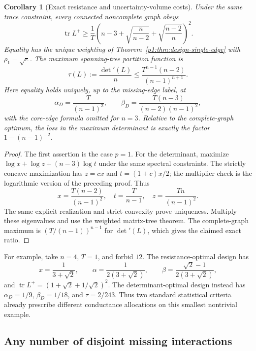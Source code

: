 \documentclass[11pt,a4paper]{article}
\newtheorem{corollary}[theorem]{Corollary}
\theoremstyle{definition}
\theoremstyle{remark}
\numberwithin{equation}{section}
\begin{document}
\begin{corollary}[Exact resistance and uncertainty-volume costs]
\label{p1:cor:design-single-special}
Under the same trace constraint, every connected noncomplete graph obeys
\begin{equation}\label{p1:eq:design-A-bound}
 \operatorname{tr}L^+\ge
 \frac1T\left(n-3+\sqrt{\frac n{n-2}}
                    +\sqrt{\frac{n-2}n}\right)^2.
\end{equation}
Equality has the unique weighting of
Theorem~\ref{p1:thm:design-single-edge} with $\rho_1=\sqrt c$.
The maximum spanning-tree partition function is
\begin{equation}\label{p1:eq:design-tree-bound}
 \tau(L):=\frac{\det'(L)}n
 \le\frac{T^{n-1}(n-2)}{(n-1)^{n+1}}.
\end{equation}
Here equality holds uniquely, up to the missing-edge label, at
\[
 \alpha_D=\frac{T}{(n-1)^2},\qquad
 \beta_D=\frac{T(n-3)}{(n-2)(n-1)^2},
\]
with the core-edge formula omitted for $n=3$.
Relative to the complete-graph optimum, the loss in the maximum
determinant is exactly the factor $1-(n-1)^{-2}$.
\end{corollary}
\begin{proof}
The first assertion is the case $p=1$.  For the determinant, maximize
$\log x+\log z+(n-3)\log t$ under the same spectral constraints.
The strictly concave maximization has $z=cx$ and
$t=(1+c)x/2$; the multiplier check is the logarithmic version of the
preceding proof.  Thus
\[
 x=\frac{T(n-2)}{(n-1)^2},\quad
 t=\frac{T}{n-1},\quad z=\frac{Tn}{(n-1)^2}.
\]
The same explicit realization and strict convexity prove uniqueness.
Multiply these eigenvalues and use the weighted matrix-tree theorem.
The complete-graph maximum is $(T/(n-1))^{n-1}$ for $\det'(L)$,
which gives the claimed exact ratio.
\end{proof}

For example, take $n=4$, $T=1$, and forbid $12$.
The resistance-optimal design has
\[
 x=\frac1{3+\sqrt2},\qquad
 \alpha=\frac1{2(3+\sqrt2)},\qquad
 \beta=\frac{\sqrt2-1}{2(3+\sqrt2)},
\]
and $\operatorname{tr}L^+=(1+\sqrt2+1/\sqrt2)^2$.
The determinant-optimal design instead has
$\alpha_D=1/9$, $\beta_D=1/18$, and $\tau=2/243$.
Thus two standard statistical criteria already prescribe different
conductance allocations on this smallest nontrivial example.

\subsection{Any number of disjoint missing interactions}
\end{document}
